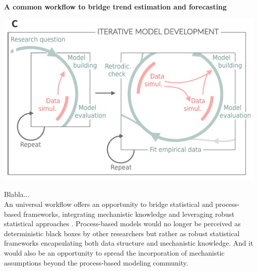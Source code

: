 \documentclass[11pt]{article}
\begin{document}
\begin{tcolorbox}
\centerline{\bf A common workflow to bridge trend estimation and forecasting} %
\vspace*{-3mm}
{\begin{multicols}{2}
\begin{minipage}[t]{\linewidth}
\includegraphics[width=\linewidth]{figures/iterativeworkflow_details}
    
\vspace*{1mm}
\end{minipage}

\columnbreak
\vspace*{1mm}
Blabla... \\
An universal workflow offers an opportunity to bridge statistical and process-based frameworks, integrating mechanistic knowledge and leveraging robust statistical approaches \citep[e.g.][]{rounce2020quantifying}. Process-based models would no longer be perceived as deterministic black boxes by other researchers but rather as robust statistical frameworks encapsulating both data structure and mechanistic knowledge. And it would also be an opportunity to spread the incorporation of mechanistic assumptions beyond the process-based modeling community.

\end{multicols}}

\end{tcolorbox}
\end{document}
